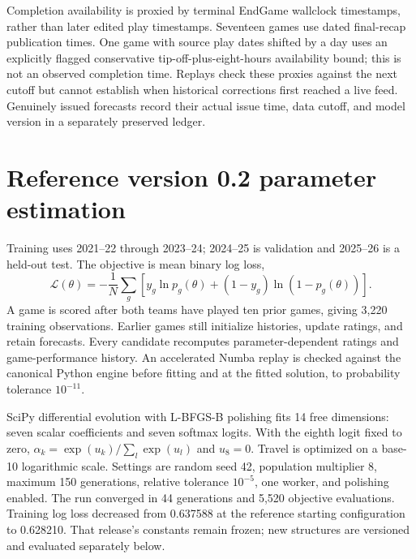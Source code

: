 \documentclass[11pt]{article}
\begin{document}
Completion availability is proxied by terminal EndGame wallclock timestamps,
rather than later edited play timestamps. Seventeen games use dated final-recap
publication times. One game with source play dates shifted by a day uses an
explicitly flagged conservative tip-off-plus-eight-hours availability bound;
this is not an observed completion time. Replays check these proxies against
the next cutoff but cannot establish when historical corrections first reached
a live feed. Genuinely issued forecasts record their actual issue time,
data cutoff, and model version in a separately preserved ledger.


\section{Reference version 0.2 parameter estimation}
Training uses 2021--22 through 2023--24; 2024--25 is validation and 2025--26 is
a held-out test. The objective is mean binary log loss,
\begin{equation}
 \mathcal L(\theta)=-\frac1N\sum_g
 [y_g\ln p_g(\theta)+(1-y_g)\ln(1-p_g(\theta))].
\end{equation}
A game is scored after both teams have played ten prior games, giving 3,220
training observations. Earlier games still initialize histories, update
ratings, and retain forecasts. Every candidate recomputes parameter-dependent
ratings and game-performance history. An accelerated Numba replay is checked against the
canonical Python engine before fitting and at the fitted solution, to
probability tolerance $10^{-11}$.

SciPy differential evolution with L-BFGS-B polishing \cite{scipy} fits 14 free
dimensions: seven scalar coefficients and seven softmax logits. With the eighth
logit fixed to zero, $\alpha_k=\exp(u_k)/\sum_l\exp(u_l)$ and $u_8=0$.
Travel is optimized on a base-10 logarithmic scale. Settings are random seed
42, population multiplier 8, maximum 150 generations, relative tolerance
$10^{-5}$, one worker, and polishing enabled. The run converged in 44 generations
and 5,520 objective evaluations. Training log loss decreased from 0.637588 at
the reference starting configuration to 0.628210. That release's constants
remain frozen; new structures are versioned and evaluated separately below.
\end{document}
